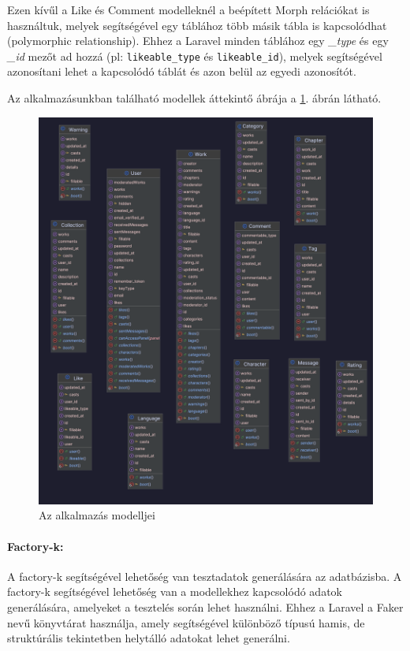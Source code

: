 Ezen kívűl a Like és Comment modelleknél a beépített Morph relációkat is használtuk, melyek segítségével egy táblához több másik tábla is kapcsolódhat (polymorphic relationship). Ehhez a Laravel minden táblához egy \textit{\_type} és egy \textit{\_id} mezőt ad hozzá (pl: \texttt{likeable\_type} és \texttt{likeable\_id}), melyek segítségével azonosítani lehet a kapcsolódó táblát és azon belül az egyedi azonosítót.

Az alkalmazásunkban található modellek áttekintő ábrája a \ref{fig:models}. ábrán látható.

\begin{figure}[H]
    \centering
    \includegraphics[scale=0.1]{./figures/models.png}
    \caption{Az alkalmazás modelljei}
    \label{fig:models}
\end{figure}


\paragraph{Factory-k:}
A factory-k segítségével lehetőség van tesztadatok generálására az adatbázisba. A factory-k segítségével lehetőség van a modellekhez kapcsolódó adatok generálására, amelyeket a tesztelés során lehet használni. Ehhez a Laravel a Faker nevű könyvtárat használja, amely segítségével különböző típusú hamis, de struktúrális tekintetben helytálló adatokat lehet generálni.

